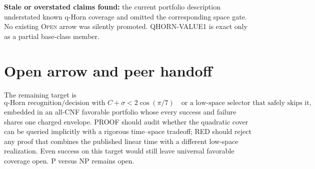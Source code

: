 \documentclass[11pt]{article}
\begin{document}
\textbf{Stale or overstated claims found:} the current portfolio description
understated known q-Horn coverage and omitted the corresponding space gate.
No existing \textsc{Open} arrow was silently promoted.  QHORN-VALUE1 is exact
only as a partial base-class member.

\section{Open arrow and peer handoff}
The remaining target is
\[
\boxed{
\text{q-Horn recognition/decision with }C+\sigma<2\cos(\pi/7)
\quad\text{or a low-space selector that safely skips it,}
}
\]
embedded in an all-CNF favorable portfolio whose every success and failure
shares one charged envelope.  PROOF should audit whether the quadratic cover
can be queried implicitly with a rigorous time--space tradeoff; RED should
reject any proof that combines the published linear time with a different
low-space realization.  Even success on this target would still leave
universal favorable coverage open.  P versus NP remains open.



\end{document}

